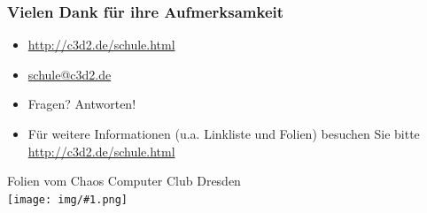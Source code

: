 \documentclass[14pt,handout]{beamer}
\newcommand{\cc}[1]{\texttt{[image: img/\#1.png]}}
\begin{document}
\begin{frame}
    \frametitle{Vielen Dank für ihre Aufmerksamkeit}
    \begin{itemize}
        \item \url{http://c3d2.de/schule.html}
        \item \url{schule@c3d2.de}
        \item Fragen? Antworten!
        \item Für weitere Informationen (u.a. Linkliste und Folien) besuchen Sie bitte \url{http://c3d2.de/schule.html}
    \end{itemize}
    \begin{center}
   Folien vom Chaos Computer Club Dresden\\
   {\cc{by-sa}}
   \end{center}
\end{frame}
\end{document}
